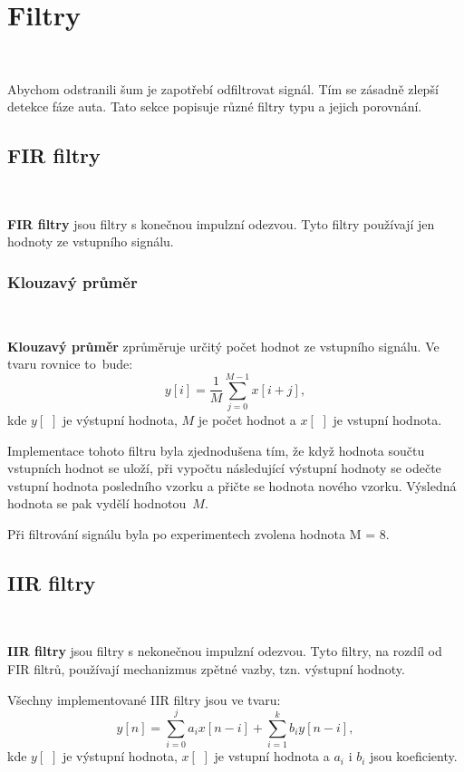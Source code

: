 \chapter{Filtry}
\label{sec:Filters}
\vspace{-30pt}
\

Abychom odstranili šum je zapotřebí odfiltrovat signál. Tím se zásadně zlepší
detekce fáze auta. Tato sekce popisuje různé filtry typu  a jejich
porovnání.

\section{FIR filtry}\

\textbf{FIR filtry} jsou filtry s konečnou impulzní odezvou. Tyto filtry používají
jen hodnoty ze vstupního signálu\cite{FIR}.

\subsection{Klouzavý průměr}\

\textbf{Klouzavý průměr} zprůměruje určitý počet hodnot ze vstupního signálu. Ve
tvaru rovnice to~bude:
\begin{equation}
y[i] = \frac{1}{M}\sum_{j = 0}^{M - 1}x[i+j],
\end{equation}
kde $y[\,\,]$ je výstupní hodnota, $M$ je počet hodnot a $x[\,\,]$ je vstupní
hodnota\cite{Filters}.

Implementace tohoto filtru byla zjednodušena tím, že když hodnota součtu vstupních
hodnot se uloží, při vypočtu následující výstupní hodnoty se odečte vstupní hodnota
posledního vzorku a přičte se hodnota nového vzorku. Výsledná hodnota se pak vydělí
hodnotou~$M$\cite{krokomer}.

Při filtrování signálu byla po experimentech zvolena hodnota M = 8.

\section{IIR filtry}\

\textbf{IIR filtry} jsou filtry s nekonečnou impulzní odezvou. Tyto filtry, na
rozdíl od FIR filtrů, používají mechanizmus zpětné vazby, tzn. výstupní
hodnoty\cite{IIR}.

Všechny implementované IIR filtry jsou ve tvaru:
\begin{equation}
y[n] = \sum_{i = 0}^{j}a_{i}x[n - i] + \sum_{i = 1}^{k}b_{i}y[n - i],
\end{equation}
kde $y[\,\,]$ je výstupní hodnota, $x[\,\,]$ je vstupní hodnota a $a_i$ i $b_i$ jsou
koeficienty.

